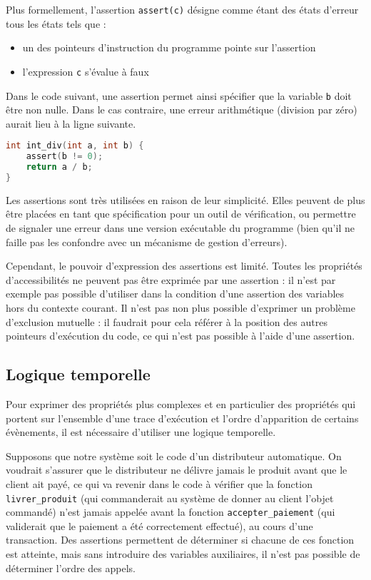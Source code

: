 Plus formellement, l'assertion \lstinline!assert(c)! désigne comme étant des
états d'erreur tous les états tels que :

\begin{itemize}
\item
  un des pointeurs d'instruction du programme pointe sur l'assertion
\item
  l'expression \lstinline!c! s'évalue à faux
\end{itemize}

Dans le code suivant, une assertion permet ainsi spécifier que la variable
\lstinline!b! doit être non nulle. Dans le cas contraire, une erreur
arithmétique (division par zéro) aurait lieu à la ligne suivante.

\begin{lstlisting}[language=C]
int int_div(int a, int b) {
    assert(b != 0);
    return a / b;
}
\end{lstlisting}

Les assertions sont très utilisées en raison de leur simplicité.
Elles peuvent de plus être placées en tant que spécification pour un outil de
vérification, ou permettre de signaler une erreur dans une version exécutable
du programme (bien qu'il ne faille pas les confondre avec un mécanisme de
gestion d'erreurs).

Cependant, le pouvoir d'expression des assertions est limité. Toutes les
propriétés d'accessibilités ne peuvent pas être exprimée par une assertion : il
n'est par exemple pas possible d'utiliser dans la condition d'une assertion des
variables hors du contexte courant. Il n'est pas non plus possible d'exprimer un
problème d'exclusion mutuelle : il faudrait pour cela référer à la position des
autres pointeurs d'exécution du code, ce qui n'est pas possible à l'aide d'une
assertion.

\subsection{Logique temporelle}

Pour exprimer des propriétés plus complexes et en particulier des propriétés qui
portent sur l'ensemble d'une trace d'exécution et l'ordre d'apparition de
certains évènements, il est nécessaire d'utiliser une logique temporelle.

Supposons que notre système soit le code d'un distributeur automatique.
On voudrait s'assurer que le distributeur ne délivre jamais le produit
avant que le client ait payé, ce qui va revenir dans le code à vérifier
que la fonction \lstinline!livrer_produit! (qui commanderait au système
de donner au client l'objet commandé) n'est jamais appelée avant la
fonction \lstinline!accepter_paiement! (qui validerait que le paiement a
été correctement effectué), au cours d'une transaction. Des assertions
permettent de déterminer si chacune de ces fonction est atteinte, mais
sans introduire des variables auxiliaires, il n'est pas possible de
déterminer l'ordre des appels.

